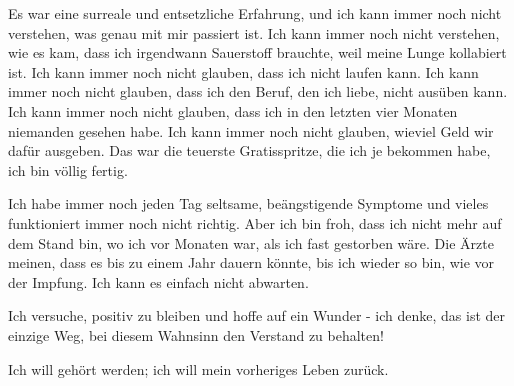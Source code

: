 Es war eine surreale und entsetzliche Erfahrung, und ich kann immer noch nicht
verstehen, was genau mit mir passiert ist. Ich kann immer noch nicht verstehen,
wie es kam, dass ich irgendwann Sauerstoff brauchte, weil meine Lunge kollabiert
ist. Ich kann immer noch nicht glauben, dass ich nicht laufen kann. Ich kann
immer noch nicht glauben, dass ich den Beruf, den ich liebe, nicht ausüben
kann. Ich kann immer noch nicht glauben, dass ich in den letzten vier Monaten
niemanden gesehen habe. Ich kann immer noch nicht glauben, wieviel Geld wir
dafür ausgeben. Das war die teuerste Gratisspritze, die ich je bekommen habe,
ich bin völlig fertig.

Ich habe immer noch jeden Tag seltsame, beängstigende Symptome und vieles
funktioniert immer noch nicht richtig. Aber ich bin froh, dass ich nicht mehr
auf dem Stand bin, wo ich vor Monaten war, als ich fast gestorben wäre. Die
Ärzte meinen, dass es bis zu einem Jahr dauern könnte, bis ich wieder so bin,
wie vor der Impfung. Ich kann es einfach nicht abwarten.

Ich versuche, positiv zu bleiben und hoffe auf ein Wunder - ich denke, das ist
der einzige Weg, bei diesem Wahnsinn den Verstand zu behalten!

Ich will gehört werden; ich will mein vorheriges Leben zurück.

